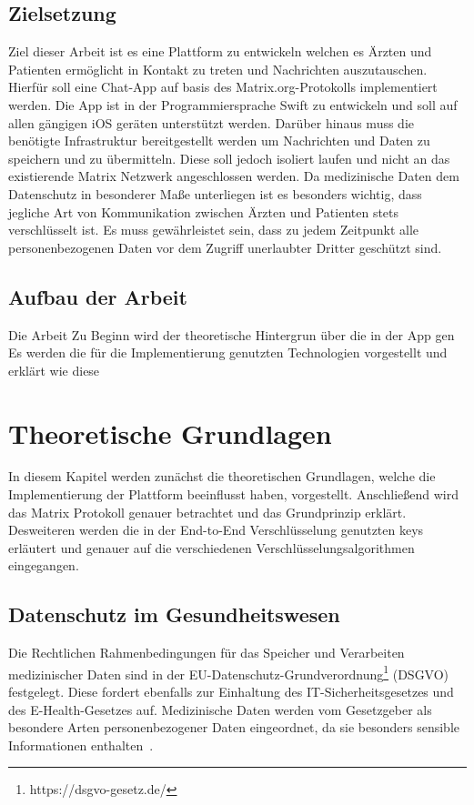     \section{Zielsetzung}\label{sec:zielsetzung}
    Ziel dieser Arbeit ist es eine Plattform zu entwickeln welchen es Ärzten und Patienten ermöglicht in Kontakt zu treten und Nachrichten auszutauschen.
    Hierfür soll eine Chat-App auf basis des Matrix.org-Protokolls implementiert werden.
    Die App ist in der Programmiersprache Swift zu entwickeln und soll auf allen gängigen iOS geräten unterstützt werden.
    Darüber hinaus muss die benötigte Infrastruktur bereitgestellt werden um Nachrichten und Daten zu speichern und zu übermitteln.
    Diese soll jedoch isoliert laufen und nicht an das existierende Matrix Netzwerk angeschlossen werden.
    Da medizinische Daten dem Datenschutz in besonderer Maße unterliegen ist es besonders wichtig,
    dass jegliche Art von Kommunikation zwischen Ärzten und Patienten stets verschlüsselt ist.
    Es muss gewährleistet sein, dass zu jedem Zeitpunkt alle personenbezogenen Daten vor dem Zugriff unerlaubter Dritter geschützt sind.

    \section{Aufbau der Arbeit}\label{sec:aufbau-der-arbeit}
    Die Arbeit
    Zu Beginn wird der theoretische Hintergrun über die in der App gen
    Es werden die für die Implementierung genutzten Technologien vorgestellt und erklärt wie diese

    \newpage
    \chapter{Theoretische Grundlagen}\label{ch:theoretische-grundlagen}
    In diesem Kapitel werden zunächst die theoretischen Grundlagen, welche die Implementierung der Plattform beeinflusst haben, vorgestellt.
    Anschließend wird das Matrix Protokoll genauer betrachtet und das Grundprinzip erklärt.
    Desweiteren werden die in der End-to-End Verschlüsselung genutzten keys erläutert und genauer auf die verschiedenen Verschlüsselungsalgorithmen eingegangen.

    \section{Datenschutz im Gesundheitswesen}\label{sec:datenschutz-im-gesundheitswesen}
    Die Rechtlichen Rahmenbedingungen für das Speicher und Verarbeiten medizinischer Daten sind in der EU-Datenschutz-Grundverordnung\footnote{https://dsgvo-gesetz.de/} (DSGVO) festgelegt.
    Diese fordert ebenfalls zur Einhaltung des IT-Sicherheitsgesetzes und des E-Health-Gesetzes auf.
    Medizinische Daten werden vom Gesetzgeber als besondere Arten personenbezogener Daten eingeordnet, da sie besonders sensible Informationen enthalten~\cite{datenschutzimgesundeitswesen}.


